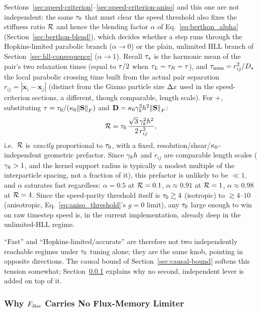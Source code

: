Sections~\ref{sec:speed-criterion}--\ref{sec:speed-criterion-aniso} and
this one are not independent: the same $\tau_0$ that must clear the
speed threshold also fixes the stiffness ratio $\mathcal{R}$ and hence the
blending factor $\alpha$ of Eq.~\eqref{eq:berthon_alpha}
(Section~\ref{sec:berthon-blend}), which decides whether a
step runs through the Hopkins-limited parabolic branch ($\alpha\to0$) or
the plain, unlimited HLL branch of Section~\ref{sec:hll-consequence}
($\alpha\to1$). Recall $\tau_\star$ is the harmonic mean of the
pair's two relaxation times (equal to $\tau/2$ when
$\tau_L=\tau_R=\tau$), and
$\tau_{\rm num}=r_{ij}^2/D_\star$ the local parabolic crossing time
built from the actual pair separation $r_{ij}=|\mathbf x_i-\mathbf x_j|$
(distinct from the Gizmo particle size $\Delta x$ used in the speed-criterion
sections, a different, though comparable, length scale). For
+, substituting
$\tau=\tau_0/(\kappa_{0}\norm{\mathbf{S}}_F)$ and
$\mathbf{D}=\kappa_{0}\gamma_{k}^2h^2\norm{\mathbf{S}}_F$:
\begin{equation}
  \mathcal{R} = \tau_0\,\frac{\sqrt3\,\gamma_{k}^2h^2}{2\,r_{ij}^2} ,
\end{equation}
i.e.\ $\mathcal{R}$ is \emph{exactly} proportional to $\tau_0$, with a
fixed, resolution/shear/$\kappa_{0}$-independent geometric prefactor. Since $\gamma_{k} h$
and $r_{ij}$ are comparable length scales ($\gamma_{k}>1$, and the kernel
support radius is typically a modest multiple of the interparticle
spacing, not a fraction of it), this prefactor is unlikely to be
$\ll1$, and $\alpha$ saturates fast regardless: $\alpha=0.5$ at
$\mathcal{R}=0.1$, $\alpha\approx0.91$ at $\mathcal{R}=1$,
$\alpha\approx0.98$ at $\mathcal{R}=4$. Since the speed-parity threshold
itself is $\tau_0\gtrsim4$ (isotropic) to $\gtrsim4$--$10$
(anisotropic, Eq.~\eqref{eq:aniso_threshold}'s $g=0$ limit), any
$\tau_0$ large enough to win on raw timestep speed is, in the
current implementation, already deep in the unlimited-HLL regime.

``Fast'' and ``Hopkins-limited/accurate'' are therefore not two
independently reachable regimes under $\tau_0$ tuning alone; they
are the same knob, pointing in opposite directions. The causal bound of
Section~\ref{sec:causal-bound} softens this tension somewhat;
Section~\ref{sec:hyperbolic-limiter} explains why no second, independent
lever is added on top of it.

\subsubsection{Why $F_{\rm diss}$ Carries No Flux-Memory Limiter}
\label{sec:hyperbolic-limiter}

